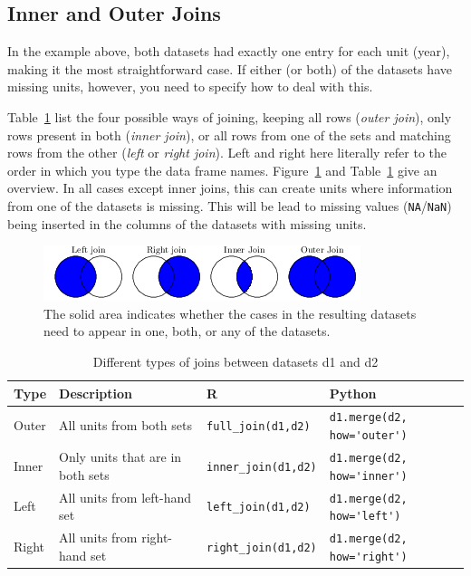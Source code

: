 \subsection{Inner and Outer Joins}\label{sec:innerouter}

In the example above, both datasets had exactly one entry for each unit (year), making it the most straightforward case.
If either (or both) of the datasets have missing units, however, you need to specify how to deal with this.

Table~\ref{tab:joins} list the four possible ways of joining, keeping all rows (\emph{outer join}), only rows present in both (\emph{inner join}), or all rows from one of the sets and matching rows from the other (\emph{left} or \emph{right join}). Left and right here literally refer to the order in which you type the data frame names. Figure~\ref{fig:joinvenn} and Table~\ref{tab:joins} give an overview.
In all cases except inner joins, this can create units where information from one of the datasets is missing.
This will be lead to missing values (\verb|NA|/\verb|NaN|) being inserted in the columns of the datasets with missing units.

\begin{figure}
    \centering
    \includegraphics{figures/ch07_figjoins.png}
    \caption{The solid area indicates whether the cases in the resulting datasets need to appear in one, both, or any of the datasets.}
    \label{fig:joinvenn}
\end{figure}

\begin{table}
  \caption{\label{tab:joins}Different types of joins between datasets d1 and d2}{
  \begin{tabularx}{\linewidth}{lXll}
    \toprule
    Type &  Description  & R & Python \\
    \midrule
    Outer &  All units from both sets & \verb|full_join(d1,d2)| & \verb|d1.merge(d2, how='outer')| \\
    Inner & Only units that are in both sets & \verb|inner_join(d1,d2)| & \verb|d1.merge(d2, how='inner')| \\
    Left & All units from left-hand set & \verb|left_join(d1,d2)| & \verb|d1.merge(d2, how='left')| \\
    Right & All units from right-hand set & \verb|right_join(d1,d2)| & \verb|d1.merge(d2, how='right')| \\
    \bottomrule
  \end{tabularx}}{}
\end{table}


